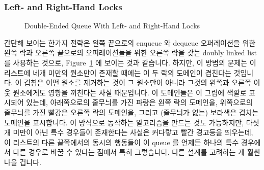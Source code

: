 \fi

\subsubsection{Left- and Right-Hand Locks}
\label{sec:SMPdesign:Left- and Right-Hand Locks}

\begin{figure}[tb]
\centering
{}
\caption{Double-Ended Queue With Left- and Right-Hand Locks}
\label{fig:SMPdesign:Double-Ended Queue With Left- and Right-Hand Locks}
\end{figure}

간단해 보이는 한가지 전략은 왼쪽 끝으로의 enqueue 와 dequeue 오퍼레이션을 위한
왼쪽 락과 오른쪽 끝으로의 오퍼레이션들을 위한 오른쪽 락을 갖는 doubly linked
list 를 사용하는 것으로,
Figure~\ref{fig:SMPdesign:Double-Ended Queue With Left- and Right-Hand Locks}
에 보이는 것과 같습니다.
하지만, 이 방법의 문제는 이 리스트에 네개 미만의 원소만이 존재할 때에는 이 두
락의 도메인이 겹친다는 것입니다.
이 겹침은 어떤 원소를 제거하는 것이 그 원소만이 아니라 그것의 왼쪽과 오른쪽
이웃 원소에게도 영향을 끼친다는 사실 때문입니다.
이 도메인들은 이 그림에 색깔로 표시되어 있는데, 아래쪽으로의 줄무늬를 가진
파랑은 왼쪽 락의 도메인을, 위쪽으로의 줄무늬를 가진 빨강은 오른쪽 락의
도메인을, 그리고 (줄무늬가 없는) 보라색은 겹치는 도메인을 표시합니다.
이 방식으로 동작하는 알고리즘을 만드는 것도 가능하지만, 다섯개 미만이 아닌 특수
경우들이 존재한다는 사실은 커다랗고 빨간 경고등을 띄우는데, 이 리스트의 다른
끝쪽에서의 동시의 행동들이 이 queue 를 언제든 하나의 특수 경우에서 다른 경우로
바꿀 수 있다는 점에서 특히 그렇습니다.
다른 설계를 고려하는 게 훨씬 나을 겁니다.

